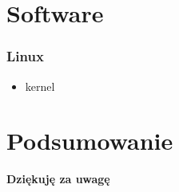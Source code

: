 \documentclass{beamer}
\newenvironment{ramka}{\begin{frame}}
{
		\end{frame}
}
\begin{document}
	\section{Software}
	\begin{ramka}
		\frametitle{Linux}
		\begin{itemize}
			\item<1-> kernel
		\end{itemize}
	\end{ramka} 
	
	\section*{Podsumowanie}
	\begin{ramka}
		\begin{center}
			\textbf{\Large{Dziękuję za uwagę}}
		\end{center}
	\end{ramka}
\end{document}

